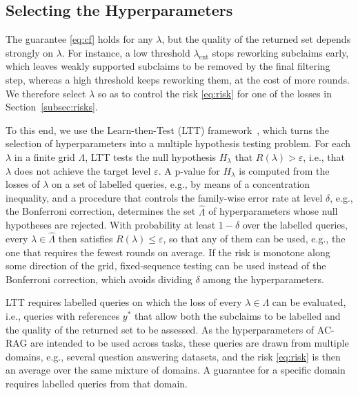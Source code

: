 \subsection{Selecting the Hyperparameters}\label{subsec:ltt}

The guarantee \eqref{eq:cf} holds for any $\lambda$, but the quality of the returned set depends strongly on $\lambda$. For instance, a low threshold $\lambda_{\mathrm{ent}}$ stops reworking subclaims early, which leaves weakly supported subclaims to be removed by the final filtering step, whereas a high threshold keeps reworking them, at the cost of more rounds. We therefore select $\lambda$ so as to control the risk \eqref{eq:risk} for one of the losses in Section~\ref{subsec:risks}.

To this end, we use the Learn-then-Test (LTT) framework~\cite{angelopoulos2021learn}, which turns the selection of hyperparameters into a multiple hypothesis testing problem. For each $\lambda$ in a finite grid $\Lambda$, LTT tests the null hypothesis $H_{\lambda}$ that $R(\lambda) > \varepsilon$, i.e., that $\lambda$ does not achieve the target level $\varepsilon$. A p-value for $H_{\lambda}$ is computed from the losses of $\lambda$ on a set of labelled queries, e.g., by means of a concentration inequality, and a procedure that controls the family-wise error rate at level $\delta$, e.g., the Bonferroni correction, determines the set $\hat{\Lambda}$ of hyperparameters whose null hypotheses are rejected. With probability at least $1 - \delta$ over the labelled queries, every $\lambda \in \hat{\Lambda}$ then satisfies $R(\lambda) \leq \varepsilon$, so that any of them can be used, e.g., the one that requires the fewest rounds on average. If the risk is monotone along some direction of the grid, fixed-sequence testing can be used instead of the Bonferroni correction, which avoids dividing $\delta$ among the hyperparameters.

LTT requires labelled queries on which the loss of every $\lambda \in \Lambda$ can be evaluated, i.e., queries with references $y^*$ that allow both the subclaims to be labelled and the quality of the returned set to be assessed. As the hyperparameters of AC-RAG are intended to be used across tasks, these queries are drawn from multiple domains, e.g., several question answering datasets, and the risk \eqref{eq:risk} is then an average over the same mixture of domains. A guarantee for a specific domain requires labelled queries from that domain.

